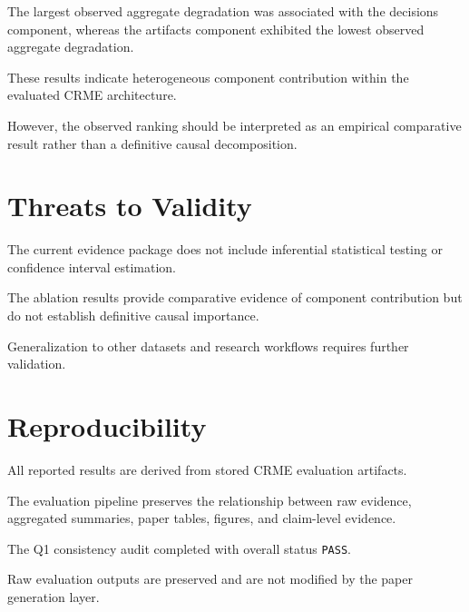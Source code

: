 The largest observed aggregate degradation was associated with the decisions component, whereas the artifacts component exhibited the lowest observed aggregate degradation.

These results indicate heterogeneous component contribution within the evaluated CRME architecture.

However, the observed ranking should be interpreted as an empirical comparative result rather than a definitive causal decomposition.

\section{Threats to Validity}

The current evidence package does not include inferential statistical testing or confidence interval estimation.

The ablation results provide comparative evidence of component contribution but do not establish definitive causal importance.

Generalization to other datasets and research workflows requires further validation.

\section{Reproducibility}

All reported results are derived from stored CRME evaluation artifacts.

The evaluation pipeline preserves the relationship between raw evidence, aggregated summaries, paper tables, figures, and claim-level evidence.

The Q1 consistency audit completed with overall status \texttt{PASS}.

Raw evaluation outputs are preserved and are not modified by the paper generation layer.
